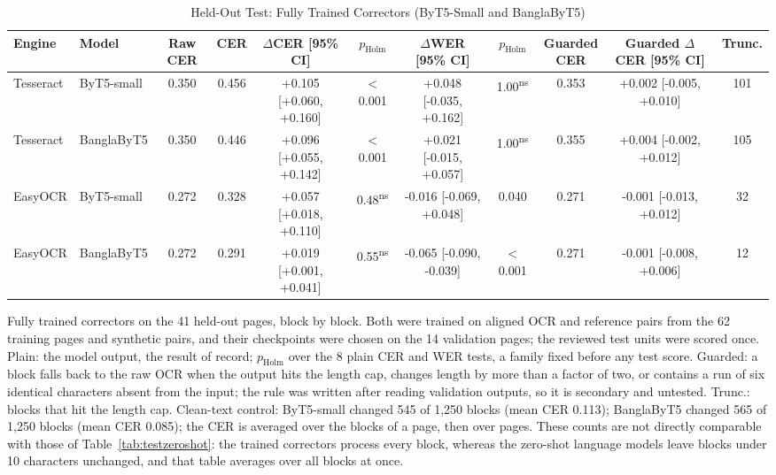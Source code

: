 \begin{table}[t]
\centering
\caption{Held-Out Test: Fully Trained Correctors (ByT5-Small and BanglaByT5)}
\label{tab:testtrained}
\setlength{\tabcolsep}{2pt}
\footnotesize
\begin{tabular}{llccccccccc}
\toprule
Engine & Model & Raw CER & CER & $\Delta$CER [95\% CI] & $p_{\mathrm{Holm}}$ & $\Delta$WER [95\% CI] & $p_{\mathrm{Holm}}$ & \shortstack{Guarded\\CER} & \shortstack{Guarded\\$\Delta$CER [95\% CI]} & Trunc. \\
\midrule
Tesseract & ByT5-small & 0.350 & 0.456 & +0.105 [+0.060, +0.160] & $<$0.001 & +0.048 [-0.035, +0.162] & 1.00\textsuperscript{ns} & 0.353 & +0.002 [-0.005, +0.010] & 101 \\
Tesseract & BanglaByT5 & 0.350 & 0.446 & +0.096 [+0.055, +0.142] & $<$0.001 & +0.021 [-0.015, +0.057] & 1.00\textsuperscript{ns} & 0.355 & +0.004 [-0.002, +0.012] & 105 \\
\midrule
EasyOCR & ByT5-small & 0.272 & 0.328 & +0.057 [+0.018, +0.110] & 0.48\textsuperscript{ns} & -0.016 [-0.069, +0.048] & 0.040 & 0.271 & -0.001 [-0.013, +0.012] & 32 \\
EasyOCR & BanglaByT5 & 0.272 & 0.291 & +0.019 [+0.001, +0.041] & 0.55\textsuperscript{ns} & -0.065 [-0.090, -0.039] & $<$0.001 & 0.271 & -0.001 [-0.008, +0.006] & 12 \\
\bottomrule
\end{tabular}
\par\smallskip
\begin{minipage}{\linewidth}\footnotesize Fully trained correctors on the 41 held-out pages, block by block. Both were trained on aligned OCR and reference pairs from the 62 training pages and synthetic pairs, and their checkpoints were chosen on the 14 validation pages; the reviewed test units were scored once. Plain: the model output, the result of record; $p_{\mathrm{Holm}}$ over the 8 plain CER and WER tests, a family fixed before any test score. Guarded: a block falls back to the raw OCR when the output hits the length cap, changes length by more than a factor of two, or contains a run of six identical characters absent from the input; the rule was written after reading validation outputs, so it is secondary and untested. Trunc.: blocks that hit the length cap. Clean-text control: ByT5-small changed 545 of 1{,}250 blocks (mean CER 0.113); BanglaByT5 changed 565 of 1{,}250 blocks (mean CER 0.085); the CER is averaged over the blocks of a page, then over pages. These counts are not directly comparable with those of Table~\ref{tab:testzeroshot}: the trained correctors process every block, whereas the zero-shot language models leave blocks under 10 characters unchanged, and that table averages over all blocks at once.\end{minipage}
\end{table}
